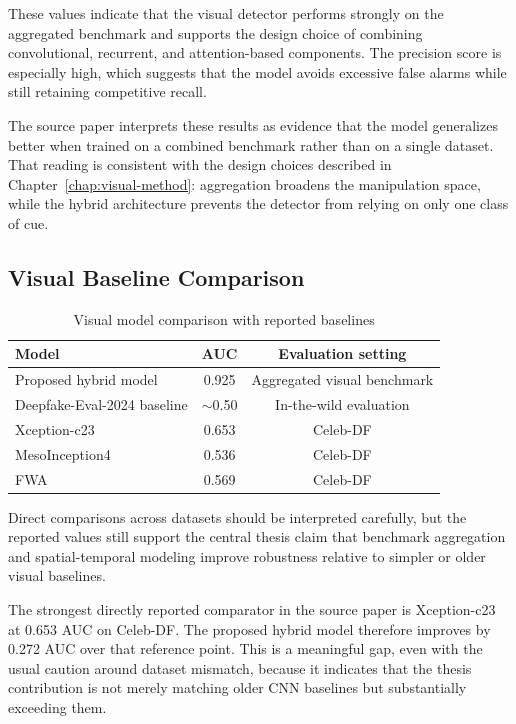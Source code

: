 These values indicate that the visual detector performs strongly on the aggregated benchmark and supports the design choice of combining convolutional, recurrent, and attention-based components. The precision score is especially high, which suggests that the model avoids excessive false alarms while still retaining competitive recall.

The source paper interprets these results as evidence that the model generalizes better when trained on a combined benchmark rather than on a single dataset. That reading is consistent with the design choices described in Chapter~\ref{chap:visual-method}: aggregation broadens the manipulation space, while the hybrid architecture prevents the detector from relying on only one class of cue.

\subsection{Visual Baseline Comparison}

\begin{table}[H]
\centering
\caption{Visual model comparison with reported baselines}
\label{tab:visual-baselines}
\begin{tabular}{l c c}
\toprule
\textbf{Model} & \textbf{AUC} & \textbf{Evaluation setting} \\
\midrule
Proposed hybrid model & 0.925 & Aggregated visual benchmark \\
Deepfake-Eval-2024 baseline & $\sim$0.50 & In-the-wild evaluation \\
Xception-c23 & 0.653 & Celeb-DF \\
MesoInception4 & 0.536 & Celeb-DF \\
FWA & 0.569 & Celeb-DF \\
\bottomrule
\end{tabular}
\end{table}

Direct comparisons across datasets should be interpreted carefully, but the reported values still support the central thesis claim that benchmark aggregation and spatial-temporal modeling improve robustness relative to simpler or older visual baselines.

The strongest directly reported comparator in the source paper is Xception-c23 at 0.653 AUC on Celeb-DF. The proposed hybrid model therefore improves by 0.272 AUC over that reference point. This is a meaningful gap, even with the usual caution around dataset mismatch, because it indicates that the thesis contribution is not merely matching older CNN baselines but substantially exceeding them.

